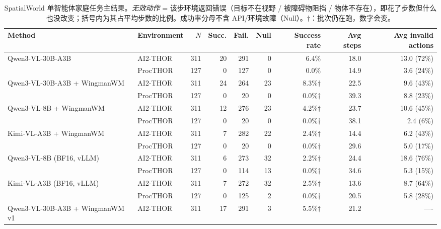\documentclass[10pt]{ctexart}
\begin{document}
\begin{table}[t]
  \centering
  \caption{SpatialWorld 单智能体家庭任务主结果。\emph{无效动作} = 该步环境返回错误（目标不在视野 / 被障碍物阻挡 / 物体不存在），即花了步数但什么也没改变；括号内为其占平均步数的比例。成功率分母不含 API/环境故障（Null）。$\dagger$：批次仍在跑，数字会变。}
  \label{tab:main-results}
  \small
  \setlength{\tabcolsep}{4pt}
  \begin{tabular}{llrrrrrrr}
    \toprule
    Method & Environment & $N$ & Succ. & Fail. & Null & Success rate & Avg steps & Avg invalid actions \\
    \midrule
    \multirow{2}{*}{Qwen3-VL-30B-A3B} & AI2-THOR & 311 & 20 & 291 & 0 & 6.4\% & 18.0 & 13.0 (72\%) \\
     & ProcTHOR & 127 & 0 & 127 & 0 & 0.0\% & 14.9 & 3.6 (24\%) \\
    \cmidrule(l){1-9}
    \multirow{2}{*}{Qwen3-VL-30B-A3B + WingmanWM} & AI2-THOR & 311 & 24 & 264 & 23 & 8.3\%$\dagger$ & 22.5 & 9.6 (43\%) \\
     & ProcTHOR & 127 & 0 & 20 & 0 & 0.0\%$\dagger$ & 39.3 & 8.8 (23\%) \\
    \cmidrule(l){1-9}
    \multirow{2}{*}{Qwen3-VL-8B + WingmanWM} & AI2-THOR & 311 & 12 & 276 & 23 & 4.2\%$\dagger$ & 23.7 & 10.6 (45\%) \\
     & ProcTHOR & 127 & 0 & 20 & 0 & 0.0\%$\dagger$ & 38.1 & 2.4 (6\%) \\
    \cmidrule(l){1-9}
    \multirow{2}{*}{Kimi-VL-A3B + WingmanWM} & AI2-THOR & 311 & 7 & 282 & 22 & 2.4\%$\dagger$ & 14.4 & 6.2 (43\%) \\
     & ProcTHOR & 127 & 0 & 20 & 0 & 0.0\%$\dagger$ & 29.6 & 5.0 (17\%) \\
    \cmidrule(l){1-9}
    \multirow{2}{*}{Qwen3-VL-8B (BF16, vLLM)} & AI2-THOR & 311 & 6 & 273 & 32 & 2.2\%$\dagger$ & 24.4 & 18.6 (76\%) \\
     & ProcTHOR & 127 & 0 & 114 & 13 & 0.0\%$\dagger$ & 34.6 & 5.3 (15\%) \\
    \cmidrule(l){1-9}
    \multirow{2}{*}{Kimi-VL-A3B (BF16, vLLM)} & AI2-THOR & 311 & 7 & 272 & 32 & 2.5\%$\dagger$ & 13.6 & 8.7 (64\%) \\
     & ProcTHOR & 127 & 0 & 125 & 2 & 0.0\%$\dagger$ & 20.5 & 5.8 (28\%) \\
    \cmidrule(l){1-9}
    Qwen3-VL-30B-A3B + WingmanWM v1 & AI2-THOR & 311 & 17 & 291 & 3 & 5.5\%$\dagger$ & 21.2 & ---- \\

\end{tabular}
\end{table}
\end{document}
